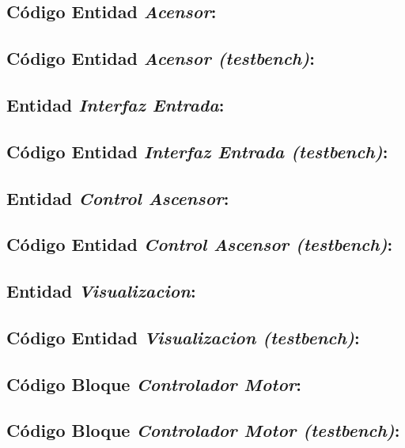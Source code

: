 \subsection{Código Entidad \textit{Acensor}:} \label{code:Acensor}

\subsection{Código Entidad \textit{Acensor (testbench)}:} \label{code:Acensor_tb}

\subsection{Entidad \textit{Interfaz Entrada}:} \label{code:InterfazEntrada}

\subsection{Código Entidad \textit{Interfaz Entrada (testbench)}:} \label{code:InterfazEntrada_tb}

\subsection{Entidad \textit{Control Ascensor}:} \label{code:ControlAscensor}

\subsection{Código Entidad \textit{Control Ascensor (testbench)}:} \label{code:ControlAscensor_tb}

\subsection{Entidad \textit{Visualizacion}:} \label{code:Visualizacion}

\subsection{Código Entidad \textit{Visualizacion (testbench)}:} \label{code:Visualizacion_tb}

\subsection{Código Bloque \textit{Controlador Motor}:} \label{code:ControladorMotor}

\subsection{Código Bloque \textit{Controlador Motor (testbench)}:} \label{code:ControladorMotor_tb}

